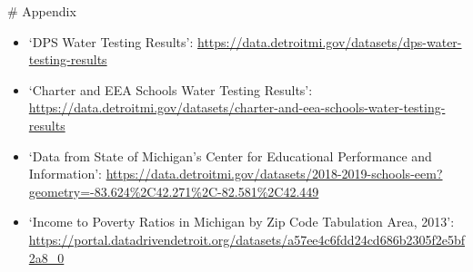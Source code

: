\documentclass[
]{article}
\providecommand{\tightlist}{%
  \setlength{\itemsep}{0pt}\setlength{\parskip}{0pt}}
\begin{document}
\# Appendix

\begin{itemize}
\tightlist
\item
  `DPS Water Testing Results':
  \url{https://data.detroitmi.gov/datasets/dps-water-testing-results}
\item
  `Charter and EEA Schools Water Testing Results':
  \url{https://data.detroitmi.gov/datasets/charter-and-eea-schools-water-testing-results}
\item
  `Data from State of Michigan's Center for Educational Performance and
  Information':
  \url{https://data.detroitmi.gov/datasets/2018-2019-schools-eem?geometry=-83.624\%2C42.271\%2C-82.581\%2C42.449}
\item
  `Income to Poverty Ratios in Michigan by Zip Code Tabulation Area,
  2013':
  \url{https://portal.datadrivendetroit.org/datasets/a57ee4c6fdd24cd686b2305f2e5bf2a8_0}
\end{itemize}
\end{document}
